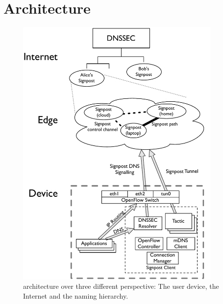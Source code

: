 \section{\signpost Architecture}\label{sec:signpost-architecture}

\begin{figure}
  \begin{center}
	\includegraphics[width=0.9\textwidth]{signpost-arch}
  \end{center}
  \caption[\signpost architecture.]{\signpost architecture over three different
    perspective: The user device, the Internet and the naming hierarchy.}
  \label{fig:signpost-arch}
\end{figure}

